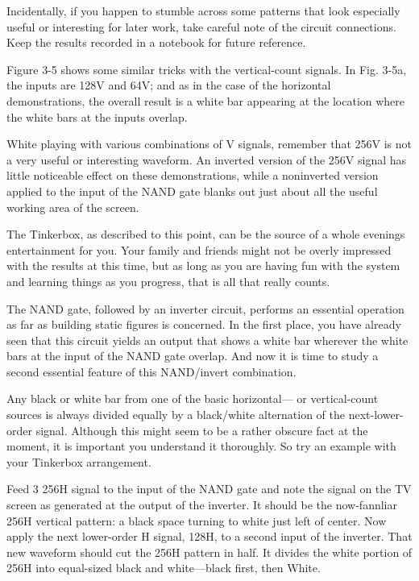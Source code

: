 \documentclass[11pt]{book}              %
\begin{document}
Incidentally, if you happen to stumble across some patterns that look especially useful or interesting for later work, take careful note of the circuit connections. Keep the results recorded in a notebook for future reference.

Figure 3-5 shows some similar tricks with the vertical-count signals. In Fig. 3-5a, the inputs are 128V and 64V; and as in the case of the horizontal demonstrations, the overall result is a white bar appearing at the location where the white bars at the inputs overlap.

White playing with various combinations of V signals, remember that 256V is not a very useful or interesting waveform. An inverted version of the 256V signal has little noticeable effect on these demonstrations, while a noninverted version applied to the input of the NAND gate blanks out just about all the useful working area of the screen.

The Tinkerbox, as described to this point, can be the source of a whole evenings entertainment for you. Your family and friends might not be overly impressed with the results at this time, but as long as you are having fun with the system and learning things as you progress, that is all that really counts.


The NAND gate, followed by an inverter circuit, performs an essential operation as far as building static figures is concerned. In the first place, you have already seen that this circuit yields an output that shows a white bar wherever the white bars at the input of the NAND gate overlap. And now it is time to study a second essential feature of this NAND/invert combination.

Any black or white bar from one of the basic horizontal— or vertical-count sources is always divided equally by a black/white alternation of the next-lower-order signal. Although this might seem to be a rather obscure fact at the moment, it is important you understand it thoroughly. So try an example with your Tinkerbox arrangement.

Feed 3 256H signal to the input of the NAND gate and note the signal on the TV screen as generated at the output of the inverter. It should be the now-fannliar 256H vertical pattern: a black space turning to white just left of center. Now apply the next lower-order H signal, 128H, to a second input of the inverter. That new waveform should cut the 256H pattern in half. It divides the white portion of 256H into equal-sized black and white—black first, then White.
\end{document}

